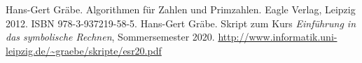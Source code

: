 \documentclass[11pt]{article}
\begin{document}
\begin{thebibliography}{xxx}
 Hans-Gert Gräbe. Algorithmen für Zahlen und Primzahlen.
  Eagle Verlag, Leipzig 2012. ISBN 978-3-937219-58-5. 
 Hans-Gert Gräbe.  Skript zum Kurs \emph{Einführung in das
  symbolische Rechnen}, Sommersemester 2020.
  \url{http://www.informatik.uni-leipzig.de/~graebe/skripte/esr20.pdf}
\end{thebibliography}
\end{document}
